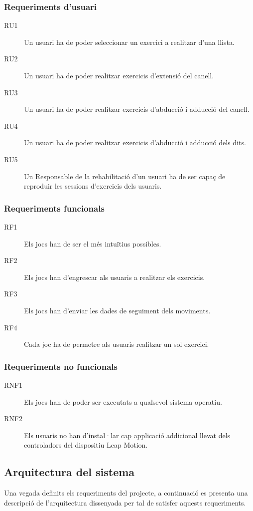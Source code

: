 \documentclass[12pt,a4paper,catalan]{article}
\begin{document}
	\subsubsection*{Requeriments d'usuari}
	\begin{description}
		\item [RU1] Un usuari ha de poder seleccionar un exercici a realitzar d'una llista.
		\item [RU2] Un usuari ha de poder realitzar exercicis d'extensió del canell.
		\item [RU3] Un usuari ha de poder realitzar exercicis d'abducció i adducció del canell.
		\item [RU4] Un usuari ha de poder realitzar exercicis d'abducció i adducció dels dits.
		\item [RU5] Un Responsable de la rehabilitació d'un usuari ha de ser capaç de reproduir les sessions d'exercicis dels usuaris.
	\end{description}
	\subsubsection*{Requeriments funcionals}
	\begin{description}
		\item [RF1] Els jocs han de ser el més intuïtius possibles.
		\item [RF2] Els jocs han d'engrescar als usuaris a realitzar els exercicis.
		\item [RF3] Els jocs han d'enviar les dades de seguiment dels moviments.
		\item [RF4] Cada joc ha de permetre als usuaris realitzar un sol exercici.
	\end{description}
	\subsubsection*{Requeriments no funcionals}
	\begin{description}
		\item [RNF1] Els jocs han de poder ser executats a qualsevol sistema operatiu.
		\item [RNF2] Els usuaris no han d'instal·lar cap applicació addicional llevat dels controladors del dispositiu Leap Motion.
	\end{description}
	\subsection{Arquitectura del sistema}
	Una vegada definits els requeriments del projecte, a continuació es presenta una descripció de l'arquitectura dissenyada per tal de satisfer aquests requeriments.
	
\end{document}
